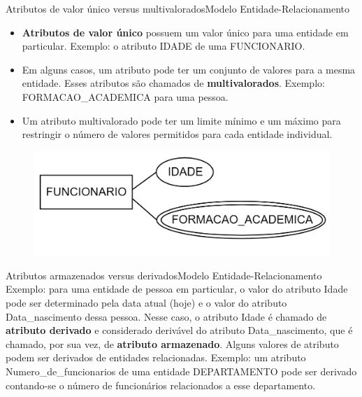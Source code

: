 \documentclass[t]{beamer}
\begin{document}
\begin{ftst}{Atributos de valor único versus multivalorados}{Modelo Entidade-Relacionamento}
\small
\begin{itemize}
    \item \textbf{Atributos de valor único} possuem um valor único para uma entidade em particular. Exemplo: o atributo IDADE de uma FUNCIONARIO.
    
    \item Em alguns casos, um atributo pode ter um conjunto de valores para a mesma entidade. Esses atributos são chamados de \textbf{multivalorados}. Exemplo: FORMACAO\_ACADEMICA para uma pessoa.
    
    \item Um atributo multivalorado pode ter um limite mínimo e um máximo para restringir o número de valores permitidos para cada entidade individual. 
\end{itemize}
\begin{figure}
    \centering
    \includegraphics[scale=0.2]{Figuras/01_6.png}
\end{figure}

\end{ftst}


\begin{ftst}{Atributos armazenados versus derivados}{Modelo Entidade-Relacionamento}
\vone
Exemplo: para uma entidade de pessoa em particular, o valor do atributo Idade pode ser determinado pela data atual (hoje) e o valor do atributo Data\_nascimento dessa pessoa.
\vone
Nesse caso, o atributo Idade é chamado de \textbf{atributo derivado} e considerado derivável
do atributo Data\_nascimento, que é chamado, por sua vez, de \textbf{atributo armazenado}.
\vone
Alguns valores de atributo podem ser derivados de entidades relacionadas. Exemplo: um atributo Numero\_de\_funcionarios de uma entidade DEPARTAMENTO pode ser derivado contando-se o número de funcionários relacionados a esse departamento.

\end{ftst}
\end{document}
